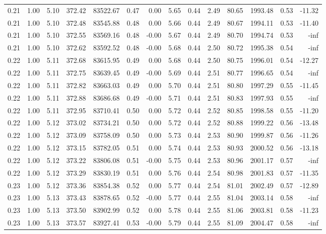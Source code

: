 \begin{table}[!ht]
\begin{tabular}{rrrrrrrrrrrrrr}
0.21 & 1.00 & 5.10 & 372.42 & 83522.67 & 0.47 & 0.00 & 5.65 & 0.44 & 2.49 & 80.65 & 1993.48 & 0.53 & -11.32 \\
0.21 & 1.00 & 5.10 & 372.48 & 83545.88 & 0.48 & 0.00 & 5.66 & 0.44 & 2.49 & 80.67 & 1994.11 & 0.53 & -11.40 \\
0.21 & 1.00 & 5.10 & 372.55 & 83569.16 & 0.48 & -0.00 & 5.67 & 0.44 & 2.49 & 80.70 & 1994.74 & 0.53 & -inf \\
0.21 & 1.00 & 5.10 & 372.62 & 83592.52 & 0.48 & -0.00 & 5.68 & 0.44 & 2.50 & 80.72 & 1995.38 & 0.54 & -inf \\
0.22 & 1.00 & 5.11 & 372.68 & 83615.95 & 0.49 & 0.00 & 5.68 & 0.44 & 2.50 & 80.75 & 1996.01 & 0.54 & -12.27 \\
0.22 & 1.00 & 5.11 & 372.75 & 83639.45 & 0.49 & -0.00 & 5.69 & 0.44 & 2.51 & 80.77 & 1996.65 & 0.54 & -inf \\
0.22 & 1.00 & 5.11 & 372.82 & 83663.03 & 0.49 & 0.00 & 5.70 & 0.44 & 2.51 & 80.80 & 1997.29 & 0.55 & -11.45 \\
0.22 & 1.00 & 5.11 & 372.88 & 83686.68 & 0.49 & -0.00 & 5.71 & 0.44 & 2.51 & 80.83 & 1997.93 & 0.55 & -inf \\
0.22 & 1.00 & 5.11 & 372.95 & 83710.41 & 0.50 & 0.00 & 5.72 & 0.44 & 2.52 & 80.85 & 1998.58 & 0.55 & -11.20 \\
0.22 & 1.00 & 5.12 & 373.02 & 83734.21 & 0.50 & 0.00 & 5.72 & 0.44 & 2.52 & 80.88 & 1999.22 & 0.56 & -13.48 \\
0.22 & 1.00 & 5.12 & 373.09 & 83758.09 & 0.50 & 0.00 & 5.73 & 0.44 & 2.53 & 80.90 & 1999.87 & 0.56 & -11.26 \\
0.22 & 1.00 & 5.12 & 373.15 & 83782.05 & 0.51 & 0.00 & 5.74 & 0.44 & 2.53 & 80.93 & 2000.52 & 0.56 & -13.18 \\
0.22 & 1.00 & 5.12 & 373.22 & 83806.08 & 0.51 & -0.00 & 5.75 & 0.44 & 2.53 & 80.96 & 2001.17 & 0.57 & -inf \\
0.22 & 1.00 & 5.12 & 373.29 & 83830.19 & 0.51 & 0.00 & 5.76 & 0.44 & 2.54 & 80.98 & 2001.83 & 0.57 & -11.35 \\
0.23 & 1.00 & 5.12 & 373.36 & 83854.38 & 0.52 & 0.00 & 5.77 & 0.44 & 2.54 & 81.01 & 2002.49 & 0.57 & -12.89 \\
0.23 & 1.00 & 5.13 & 373.43 & 83878.65 & 0.52 & -0.00 & 5.77 & 0.44 & 2.55 & 81.04 & 2003.14 & 0.58 & -inf \\
0.23 & 1.00 & 5.13 & 373.50 & 83902.99 & 0.52 & 0.00 & 5.78 & 0.44 & 2.55 & 81.06 & 2003.81 & 0.58 & -11.23 \\
0.23 & 1.00 & 5.13 & 373.57 & 83927.41 & 0.53 & -0.00 & 5.79 & 0.44 & 2.55 & 81.09 & 2004.47 & 0.58 & -inf \\

\end{tabular}
\end{table}
